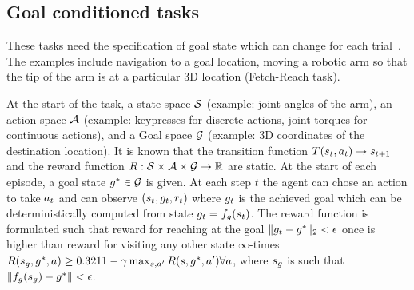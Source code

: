 \subsection{Goal conditioned tasks}
These tasks need the specification of goal state which can change for each trial~\citep{plappert201802multigoalrl}. The
examples include navigation to a goal location, moving a robotic arm so that the
tip of the arm is at a particular 3D location (Fetch-Reach task).

At the start of the task, a state space $\mathcal{S}$ (example: joint angles of the
arm), an action space $\mathcal{A}$ (example: keypresses for discrete actions, joint
torques for continuous actions), and a
Goal space $\mathcal{G}$ (example: 3D coordinates of the destination location).
It is known that the transition function $T(s_t, a_t) \rightarrow s_{t+1}$
and the reward function $R: \mathcal{S} \times \mathcal{A} \times \mathcal{G} \rightarrow
\mathbb{R}$ are static.
At the start of each episode, a goal state $g^* \in \mathcal{G}$ is given. At each
step $t$ the agent can chose an action to take $a_t$ and can observe
$(s_t, g_t, r_t)$ where $g_t$ is the achieved goal which can be
deterministically computed from state $g_t = f_g(s_t)$.
The reward function is formulated such that reward for reaching at the goal
$\|g_t - g^*\|_2 < \epsilon$ once
is higher than reward for visiting any other state $\infty$-times
$R(s_g, g^*, a) \ge
0.32{1}{1-\gamma}\max_{s, a'}R(s, g^*,
a') \forall a$, where $s_g$ is such that $\|f_g(s_g) -
g^*\| < \epsilon$.
